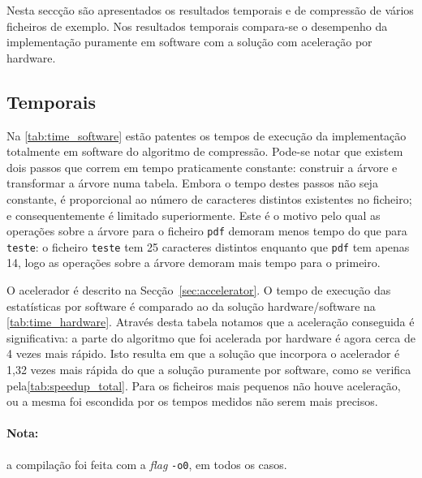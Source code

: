 Nesta seccção são apresentados os resultados temporais e de compressão de vários ficheiros de exemplo. Nos resultados temporais compara-se o desempenho da implementação puramente em software com a solução com aceleração por hardware.

\subsection{Temporais}

  Na \autoref{tab:time_software} estão patentes os tempos de execução da implementação totalmente em software do algoritmo de compressão. Pode-se notar que existem dois passos que correm em tempo praticamente constante: construir a árvore e transformar a árvore numa tabela. Embora o tempo destes passos não seja constante, é proporcional ao número de caracteres distintos existentes no ficheiro; e consequentemente é limitado superiormente. Este é o motivo pelo qual as operações sobre a árvore para o ficheiro \texttt{pdf} demoram menos tempo do que para \texttt{teste}: o ficheiro \texttt{teste} tem 25 caracteres distintos enquanto que \texttt{pdf} tem apenas 14, logo as operações sobre a árvore demoram mais tempo para o primeiro.

  O acelerador é descrito na Secção~\ref{sec:accelerator}. O tempo de execução das estatísticas por software é comparado ao da solução hardware/software na \autoref{tab:time_hardware}. Através desta tabela notamos que a aceleração conseguida é significativa: a parte do algoritmo que foi acelerada por hardware é agora cerca de 4 vezes mais rápido. Isto resulta em que a solução que incorpora o acelerador é 1,32 vezes mais rápida do que a solução puramente por software, como se verifica pela\autoref{tab:speedup_total}. Para os ficheiros mais pequenos não houve aceleração, ou a mesma foi escondida por os tempos medidos não serem mais precisos.
  
  \paragraph*{Nota:} a compilação foi feita com a \textit{flag} \texttt{-o0}, em todos os casos.


